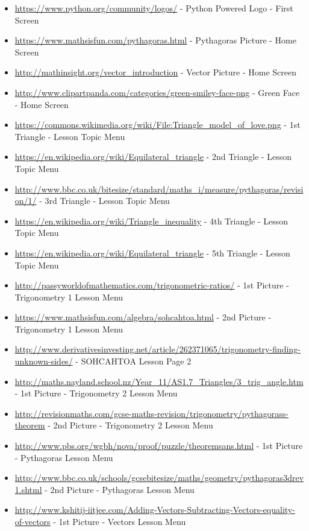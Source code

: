 \begin{itemize}
	\item \url{https://www.python.org/community/logos/} - Python Powered Logo - First Screen
	\item \url{https://www.mathsisfun.com/pythagoras.html} - Pythagoras Picture - Home Screen
	\item \url{http://mathinsight.org/vector_introduction} - Vector Picture - Home Screen
	\item \url{http://www.clipartpanda.com/categories/green-smiley-face-png} - Green Face - Home Screen
	\item \url{https://commons.wikimedia.org/wiki/File:Triangle_model_of_love.png} - 1st Triangle - Lesson Topic Menu
	\item \url{https://en.wikipedia.org/wiki/Equilateral_triangle} - 2nd Triangle - Lesson Topic Menu
	\item \url{http://www.bbc.co.uk/bitesize/standard/maths_i/measure/pythagoras/revision/1/} - 3rd Triangle - Lesson Topic Menu
	\item \url{https://en.wikipedia.org/wiki/Triangle_inequality} - 4th Triangle - Lesson Topic Menu
	\item \url{https://en.wikipedia.org/wiki/Equilateral_triangle} - 5th Triangle - Lesson Topic Menu
	\item \url{http://passyworldofmathematics.com/trigonometric-ratios/} - 1st Picture - Trigonometry 1 Lesson Menu
	\item \url{https://www.mathsisfun.com/algebra/sohcahtoa.html} - 2nd Picture - Trigonometry 1 Lesson Menu
	\item \url{http://www.derivativesinvesting.net/article/262371065/trigonometry-finding-unknown-sides/} - SOHCAHTOA Lesson Page 2
	\item \url{http://maths.nayland.school.nz/Year_11/AS1.7_Triangles/3_trig_angle.htm} - 1st Picture - Trigonometry 2 Lesson Menu
	\item \url{http://revisionmaths.com/gcse-maths-revision/trigonometry/pythagorass-theorem} - 2nd Picture - Trigonometry 2 Lesson Menu
	\item \url{http://www.pbs.org/wgbh/nova/proof/puzzle/theoremsans.html} - 1st Picture - Pythagoras Lesson Menu
	\item \url{http://www.bbc.co.uk/schools/gcsebitesize/maths/geometry/pythagoras3drev1.shtml} - 2nd Picture - Pythagoras Lesson Menu
	\item \url{http://www.kshitij-iitjee.com/Adding-Vectors-Subtracting-Vectors-equality-of-vectors} - 1st Picture - Vectors Lesson Menu

\end{itemize}
